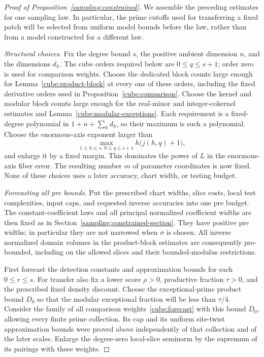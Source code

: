 \begin{proof}[Proof of Proposition~\ref{sampling:constrained}]
We assemble the preceding estimates for one sampling law.  In particular,
the prime cutoffs used for transferring a fixed patch will be selected
from uniform model bounds before the law, rather than from a model
constructed for a different law.

\emph{Structural choices.}
Fix the degree bound $s$, the positive ambient dimension $n$, and the
dimensions $d_h$.  The cube orders required below are $0\le q\le s+1$;
order zero is used for comparison weights.  Choose the dedicated block
counts large enough for Lemma~\ref{cube:product-block} at every one of
these orders, including the fixed derivative orders used in
Proposition~\ref{cube:comparison}.  Choose the kernel and modular block
counts large enough for the real-minor and integer-cokernel estimates and
Lemma~\ref{cube:modular-exceptions}.  Each requirement is a fixed-degree
polynomial in $1+n+\sum_hd_h$, so their maximum is such a polynomial.
Choose the enormous-axis exponent larger than
\[
 \max_{1\le h\le s,\ 0\le q\le s+1}h\bigl(j(h,q)+1\bigr),
\]
and enlarge it by a fixed margin.  This dominates the power of $L$ in
the enormous-axis fiber error.  The resulting number $m$ of parameter
coordinates is now fixed.  None of these choices uses a later accuracy,
chart width, or testing budget.

\emph{Forecasting all pre bounds.}
Put the prescribed chart widths, slice costs, local test complexities,
input caps, and requested inverse accuracies into one pre budget.  The
constant-coefficient laws and all principal normalized coefficient widths
are then fixed as in Section~\ref{sampling:constrained-section}.  They have positive
pre widths; in particular they are not narrowed when $\sigma$ is chosen.
All inverse normalized domain volumes in the product-block estimates
are consequently pre-bounded, including on the allowed slices and their
bounded-modulus restrictions.

First forecast the detection constants and approximation bounds for
each $0\le r\le s$.  For transfer also fix a lower score $\rho>0$,
productive fraction $\tau>0$, and the prescribed fixed density discount.
Choose the exceptional-prime product bound $D_0$ so that the modular
exceptional fraction will be less than $\tau/4$.  Consider the family of
all comparison weights~\eqref{cube:forecast} with this bound $D_0$,
allowing every finite prime collection.  Its cap and its uniform
site-twist approximation bounds were proved above independently of
that collection and of the later scales.  Enlarge the degree-zero
local-slice seminorm by the supremum of its pairings with these weights.


\end{proof}
